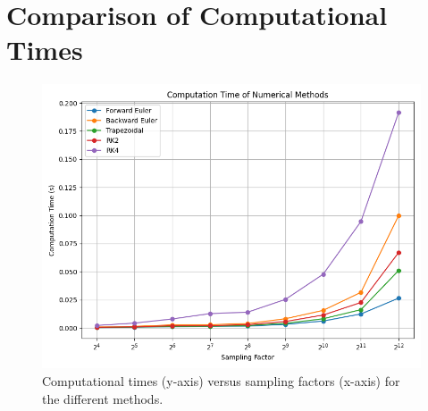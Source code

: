 \section{Comparison of Computational Times}
\begin{figure}[H]
  \centering
  \includegraphics[width=\textwidth]{figs/computation_time.png}
  \caption{Computational times (y-axis) versus sampling factors (x-axis) for the different methods.}
  \label{fig:comp_times}
\end{figure}

